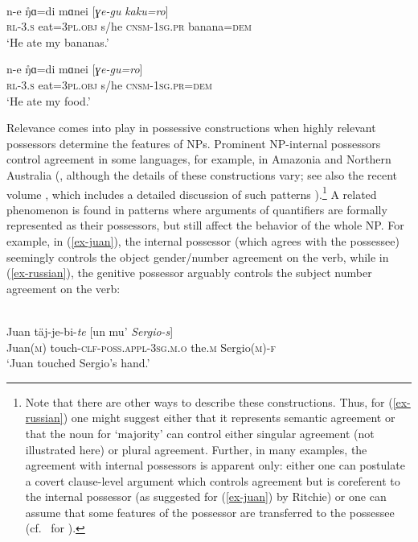 \documentclass[output=paper
  ,nobabel
  ,draftmode
  ,colorlinks, citecolor=brown
]{langscibook}
\begin{document}
\ea
{}\\
\ea 
\gll n-e	     \r{ŋ​}ɑ​=di              mɑ​nei [\emph{ɣ​e-gu}	                     \emph{kaku=ro}] \\ 
     \textsc{rl}-\textsc{3.s} eat=\textsc{3pl.obj} s/he  \spacebr{}\textsc{cnsm-1sg.pr} banana=\textsc{dem} \\
\glt `He ate my bananas.'

\ex 
\gll n-e	      \r{ŋ​}ɑ​=di              mɑ​nei [\emph{ɣ​e-gu=ro}] \\ 
     \textsc{rl}-\textsc{3.s} eat=\textsc{3pl.obj} s/he  \spacebr{}\textsc{cnsm-1sg.pr=dem} \\
\glt `He ate my food.'
\z
\z

\largerpage
\noindent
Relevance comes into play in possessive constructions when highly relevant possessors determine the features of NPs. Prominent NP-internal possessors control agreement in some languages, for example, in Amazonia \parencites[cf.][]{Dixon2000, Ritchie2017} and Northern Australia (\cite{MeakinsNordlinger2017}, although the details of these constructions vary; see also the recent volume \citep{BaranyNikolaeva2019}, which includes a detailed discussion of such patterns \citep{Nikolevaetal2019}).\footnote{Note that there are other ways to describe these constructions. Thus, for (\ref{ex-russian}) one might suggest either that it represents semantic agreement or that the noun for `majority' can control either singular agreement (not illustrated here) or plural agreement. Further, in many examples, the agreement with internal possessors is apparent only: either one can postulate a covert clause-level argument which controls agreement but is coreferent to the internal possessor (as suggested for (\ref{ex-juan}) by Ritchie) or one can assume that some features of the possessor are transferred to the possessee (cf.\ \cite{Lander2011} for ).}   
A related phenomenon is found in patterns where arguments of quantifiers are formally represented as their possessors, but still affect the behavior of the whole NP. For example, in (\ref{ex-juan}), the internal possessor (which agrees with the possessee) seemingly controls the object gender/number agreement on the verb, while in (\ref{ex-russian}), the genitive possessor arguably controls the subject number agreement on the verb:


\ea\label{ex-juan} 
\\
\gll Juan	täj-je-bi-\emph{te} [un mu' \emph{Sergio-s}] \\ {Juan(\textsc{m})}	touch-\textsc{clf-poss.appl-3sg.m.o}   the.\textsc{m}  Sergio\textsc{(m)-f} \\
\glt `Juan touched Sergio's hand.'
\z
\end{document}
